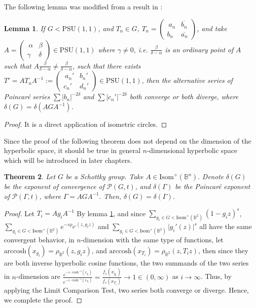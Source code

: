 \documentclass[12pt,oneside]{sfsuthesis}
\theoremstyle{plain} %
\newtheorem{theorem}{Theorem}[chapter]
\newtheorem{lemma}[theorem]{Lemma}
\theoremstyle{definition}  %
\theoremstyle{remark}  %
\theoremstyle{plain}
\begin{document}
{The following lemma was modified from a result in \cite[Section 47, P.107]{ford1929automorphic}:
\begin{lemma}\label{lemma 3.5}
If $G<\text{PSU}(1,1)$, and $T_n\in G$, $T_n=\begin{pmatrix}\
a_n &  \overline{b_n}\\
b_n &  \overline{a_n}
\end{pmatrix}$, and take $A=\begin{pmatrix}\
\alpha &  \beta \\
\gamma &  \delta
\end{pmatrix}\in \text{PSU}(1,1)$ where $\gamma\neq 0$, i.e. $\frac{\beta}{\delta-\alpha}$ is an ordinary point of $A$ such that $A\frac{\beta}{\delta-\alpha}\neq \frac{\beta}{\delta-\alpha}$, such that there exists $T'=AT_nA^{-1}:=\begin{pmatrix}\
a_n' &  b_n'\\
c_n' &  d_n'
\end{pmatrix}\in \text{PSU}(1,1)$, then the alternative series of Poincar\'{e} series $\sum\vert b_n\vert^{-2\delta}$ and $\sum\vert c_n'\vert^{-2\delta}$ both converge or both diverge, where $\delta(G)=\delta(AGA^{-1})$.
\end{lemma}
\begin{proof}
It is a direct application of isometric circles.
\end{proof}


Since the proof of the following theorem does not depend on the dimension of the hyperbolic space, it should be true in general $n$-dimensional hyperbolic space which will be introduced in later chapters.
\begin{theorem}\label{n-dim poincare series}
Let $G$ be a Schottky group. Take $A\in\text{Isom}^+(\mathbb{B}^n)$. Denote $\delta(G)$ be the exponent of convergence of $\mathcal{P}(G,t)$, and $\delta(\Gamma)$ be the Poincar\'{e} exponent of $\mathcal{P}(\Gamma,t)$, where $\Gamma=AGA^{-1}.$ Then, $\delta(G)=\delta(\Gamma).$
\end{theorem}
\begin{proof}
Let $T_i=Ag_iA^{-1}$
By lemma \ref{lemma 3.5}, and since $\sum_{g_i\in G<\text{Isom}^+(\mathbb{B}^2)}\left( 1-g_iz\right)^{s}$,\\ $\sum_{g_i\in G<\text{Isom}^+(\mathbb{B}^2)}e^{-s\rho_{\mathbb{B}^2}(z,g_iz)}$ and $\sum_{g_i\in G<\text{Isom}^+(\mathbb{B}^2)}\vert g_i'(z)\vert^{s}$ all have the same convergent behavior, in $n$-dimension with the same type of functions, let $\text{arccosh}(x_{g_i})=\rho_{\mathbb{B}^2}(z,g_iz)$, and $\text{arccosh}(x_{T_i})=\rho_{\mathbb{B}^2}(z,T_iz)$, then since they are both inverse hyperbolic cosine functions, the two summands of the two series in $n$-dimension are $
\frac{e^{-s\cdot \text{cosh}^{-1}(x_{g_i})}}{e^{-s\cdot\text{cosh}^{-1}(x_{T_i})}}=\frac{f_s(x_{g_i})}{f_s(x_{T_i})}\longrightarrow 1\in(0,\infty)
$ as $i\to \infty$. Thus, by applying the Limit Comparison Test, two series both converge or diverge. Hence, we complete the proof.
\end{proof}


}
\end{document}
